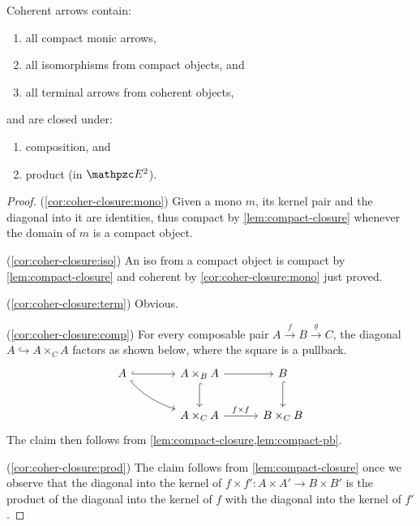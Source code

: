 \documentclass[a4paper,11pt]{amsart}
\begin{document}
\begin{cor}\label{cor:coher-closure}
	Coherent arrows contain:
	\begin{enumerate}
		\item\label{cor:coher-closure:mono}
		all compact monic arrows,
		\item\label{cor:coher-closure:iso}
		all isomorphisms from compact objects, and
		\item\label{cor:coher-closure:term}
		all terminal arrows from coherent objects,
	\end{enumerate}
	and are closed under:
	\begin{enumerate}[resume]
		\item\label{cor:coher-closure:comp}
		composition, and
		\item\label{cor:coher-closure:prod}
		product (in $\Ecat^2$).
	\end{enumerate}
\end{cor}

\begin{proof}
	(\ref*{cor:coher-closure:mono})
	Given a mono $m$, its kernel pair and the diagonal into it are identities,
	thus compact by \cref{lem:compact-closure} whenever the domain of $m$ is a compact object.
	
	(\ref*{cor:coher-closure:iso})
	An iso from a compact object is compact by \cref{lem:compact-closure}
	and coherent by \eqref{cor:coher-closure:mono} just proved.

	(\ref*{cor:coher-closure:term})
	Obvious.

	(\ref*{cor:coher-closure:comp})
	For every composable pair $A\overset{f}{\to}B\overset{g}{\to}C$,
	the diagonal $A\hookrightarrow A\times_CA$ factors as shown below, where the square is a pullback.
	\[\begin{tikzcd}[column sep=7ex, row sep=5ex]
		A	\ar[dr,hook,bend right=3ex] \ar[r,hook]	&[2ex]	A\times_BA	\ar[d,hook] \ar[r]	&	B \ar[d,hook]
		\\
		&	A\times_CA	\ar[r,"f\times f"]	&	B\times_CB
	\end{tikzcd}\]
	The claim then follows from \cref{lem:compact-closure,lem:compact-pb}.
	
	(\ref*{cor:coher-closure:prod})
	The claim follows from \cref{lem:compact-closure} once we observe that
	the diagonal into the kernel of $f\times f'\colon A\times A' \to B\times B'$ is the product of the diagonal into the kernel of $f$ with the diagonal into the kernel of $f'$.
\end{proof}
\end{document}
